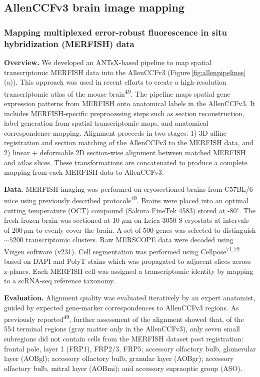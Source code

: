 \documentclass[
  12pt,
]{article}
\begin{document}
\subsection{AllenCCFv3 brain image
mapping}\label{allenccfv3-brain-image-mapping}

\subsubsection{Mapping multiplexed error-robust fluorescence in situ
hybridization (MERFISH)
data}\label{mapping-multiplexed-error-robust-fluorescence-in-situ-hybridization-merfish-data}

\textbf{Overview.} We developed an ANTsX-based pipeline to map spatial
transcriptomic MERFISH data into the AllenCCFv3
(Figure\,\ref{fig:allenpipelines}(a)). This approach was used in recent
efforts to create a high-resolution transcriptomic atlas of the mouse
brain\textsuperscript{49}. The pipeline maps spatial gene expression
patterns from MERFISH onto anatomical labels in the AllenCCFv3. It
includes MERFISH-specific preprocessing steps such as section
reconstruction, label generation from spatial transcriptomic maps, and
anatomical correspondence mapping. Alignment proceeds in two stages: 1)
3D affine registration and section matching of the AllenCCFv3 to the
MERFISH data, and 2) linear + deformable 2D section-wise alignment
between matched MERFISH and atlas slices. These transformations are
concatenated to produce a complete mapping from each MERFISH data to
AllenCCFv3.

\textbf{Data.} MERFISH imaging was performed on cryosectioned brains
from C57BL/6 mice using previously described
protocols\textsuperscript{49}. Brains were placed into an optimal
cutting temperature (OCT) compound (Sakura FineTek 4583) stored at
-80\(^\circ\). The fresh frozen brain was sectioned at 10 \(\mu\)m on
Leica 3050 S cryostats at intervals of 200\,\(\mu\)m to evenly cover the
brain. A set of 500 genes was selected to distinguish \(\sim5200\)
transcriptomic clusters. Raw MERSCOPE data were decoded using Vizgen
software (v231). Cell segmentation was performed using
Cellpose\textsuperscript{71,72} based on DAPI and PolyT stains which was
propagated to adjacent slices across z-planes. Each MERFISH cell was
assigned a transcriptomic identity by mapping to a scRNA-seq reference
taxonomy.

\textbf{Evaluation.} Alignment quality was evaluated iteratively by an
expert anatomist, guided by expected gene-marker correspondences to
AllenCCFv3 regions. As previously reported\textsuperscript{49}, further
assessment of the alignment showed that, of the 554 terminal regions
(gray matter only in the AllenCCFv3), only seven small subregions did
not contain cells from the MERFISH dataset post registration: frontal
pole, layer 1 (FRP1), FRP2/3, FRP5; accessory olfactory bulb, glomerular
layer (AOBgl); accessory olfactory bulb, granular layer (AOBgr);
accessory olfactory bulb, mitral layer (AOBmi); and accessory supraoptic
group (ASO).
\end{document}

